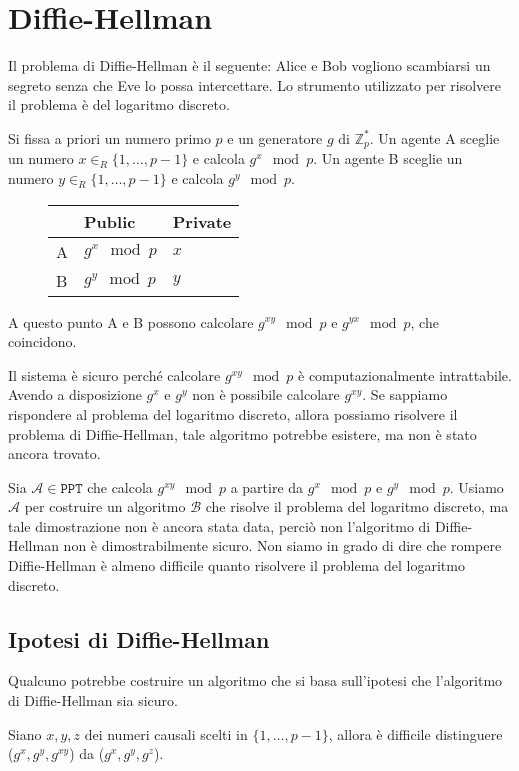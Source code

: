 \section{Diffie-Hellman}
Il problema di Diffie-Hellman è il seguente: Alice e Bob vogliono
scambiarsi un segreto senza che Eve lo possa intercettare. Lo strumento 
utilizzato per risolvere il problema è del logaritmo discreto.

Si fissa a priori un numero primo $p$ e un generatore $g$ di $\mathbb{Z}_p^*$.
Un agente A sceglie un numero $x \in_R \{1, \dots, p-1\}$ e calcola $g^x \mod p$. 
Un agente B sceglie un numero $y \in_R \{1, \dots, p-1\}$ e calcola $g^y \mod p$.

\begin{figure}[H]
    \centering
    \begin{tabular}[H]{l|l|l}
        & \textbf{Public} & \textbf{Private} \\
        \hline
        A & $g^x \mod p$ & $x$ \\
        \hline
        B & $g^y \mod p$ & $y$ \\
    \end{tabular}
\end{figure}

A questo punto A e B possono calcolare $g^{xy} \mod p$ e $g^{yx} \mod p$, che coincidono.

Il sistema è sicuro perché calcolare $g^{xy} \mod p$ è computazionalmente intrattabile. Avendo 
a disposizione $g^x$ e $g^y$ non è possibile calcolare $g^{xy}$. Se sappiamo rispondere al problema 
del logaritmo discreto, allora possiamo risolvere il problema di Diffie-Hellman, tale algoritmo 
potrebbe esistere, ma non è stato ancora trovato.

Sia $\mathcal{A} \in \texttt{PPT}$ che calcola $g^{xy} \mod p$ a partire da $g^x \mod p$ e $g^y \mod p$. 
Usiamo $\mathcal{A}$ per costruire un algoritmo $\mathcal{B}$ che risolve il problema del logaritmo discreto,
ma tale dimostrazione non è ancora stata data, perciò non l'algoritmo di Diffie-Hellman non è dimostrabilmente 
sicuro. Non siamo in grado di dire che rompere Diffie-Hellman è almeno difficile quanto risolvere il problema
del logaritmo discreto.

\subsection{Ipotesi di Diffie-Hellman}
Qualcuno potrebbe costruire un algoritmo che si basa sull'ipotesi che l'algoritmo di Diffie-Hellman sia sicuro.
\begin{tcolorbox}[title = Ipotesi di Diffie-Hellman]
    Siano $x, y, z$ dei numeri causali scelti in $\{1, \dots, p-1\}$, allora è difficile 
    distinguere ($g^x, g^y, g^{xy}$) da ($g^x, g^y, g^z$).
\end{tcolorbox}

